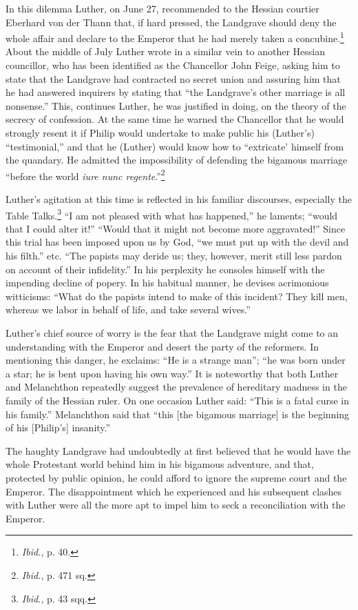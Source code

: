In this dilemma Luther, on June 27, recommended to the Hessian
courtier Eberhard von der Thann that, if hard pressed, the Landgrave
should deny the whole affair and declare to the Emperor that he had
merely taken a concubine.\footnote{\textit{Ibid.}, p. 40.}
 About the middle of July Luther wrote
in a similar vein to another Hessian councillor, who has been identified
as the Chancellor John Feige, asking him to state that the Landgrave had
contracted no secret union and assuring him that he had
answered inquirers by stating that “the Landgrave’s other marriage is
all nonsense.” This, continues Luther, he was justified in doing, on
the theory of the secrecy of confession. At the same time he warned
the Chancellor that he would strongly resent it if Philip would undertake
to make public his (Luther’s) “testimonial,” and that he (Luther) would
know how to “extricate’ himself from the quandary. He
admitted the impossibility of defending the bigamous marriage “before
the world \textit{iure nunc regente}.”\footnote{\textit{Ibid.}, p. 471 sq.}


Luther’s agitation at this time is reflected in his familiar discourses,
especially the Table Talks.\footnote{\textit{Ibid.}, p. 43 sqq.}
“I am not pleased with what has happened,” he
laments; “would that I could alter it!” “Would that it might not become
more aggravated!” Since this trial has been imposed upon us by God, “we
must put up with the devil and his filth.” etc. “The papists may deride us;
they, however, merit still less pardon on account of their infidelity.” In his
perplexity he consoles himself with the impending decline of popery. In his
habitual manner, he devises acrimonious witticisms: “What do the papists
intend to make of this incident? They kill men, whereas we labor in behalf
of life, and take several wives.”

Luther’s chief source of worry is the fear that the Landgrave might come
to an understanding with the Emperor and desert the party of the reformers.
In mentioning this danger, he exclaims: “He is a strange man”; “he was born
under a star; he is bent upon having his own way.” It is noteworthy that
both Luther and Melanchthon repeatedly suggest the prevalence of hereditary
madness in the family of the Hessian ruler. On one occasion Luther
said: “This is a fatal curse in his family.” Melanchthon said that “this [the
bigamous marriage] is the beginning of his [Philip’s] insanity.”

The haughty Landgrave had undoubtedly at first believed that he would
have the whole Protestant world behind him in his bigamous adventure, and
that, protected by public opinion, he could afford to ignore the supreme
court and the Emperor. The disappointment which he experienced and his
subsequent clashes with Luther were all the more apt to impel him to seck
a reconciliation with the Emperor.


